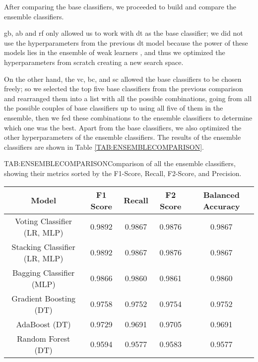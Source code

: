 After comparing the base classifiers, we proceeded to build and compare the ensemble classifiers.

\acl{gb}, \acl{ab} and \acl{rf} only allowed us to work with \acl{dt} as the base classifier; we did not use the hyperparameters from the previous \ac{dt} model because the power of these models lies in the ensemble of weak learners \cite{mannor_existence_2002}, and thus we optimized the hyperparameters from scratch creating a new search space.

On the other hand, the \acl{vc}, \acl{bc}, and \acl{sc} allowed the base classifiers to be chosen freely; so we selected the top five base classifiers from the previous comparison and rearranged them into a list with all the possible combinations, going from all the possible couples of base classifiers up to using all five of them in the ensemble, then we fed these combinations to the ensemble classifiers to determine which one was the best. Apart from the base classifiers, we also optimized the other hyperparameters of the ensemble classifiers. The results of the ensemble classifiers are shown in Table \ref{TAB:ENSEMBLECOMPARISON}.

\begin{table}[Ensemble Classifiers Comparison]{TAB:ENSEMBLECOMPARISON}{Comparison of all the ensemble classifiers, showing their metrics sorted by the F1-Score, Recall, F2-Score, and Precision.}
    \small
    \begin{tabular}{|c|c|c|c|c|}
        \hline
        \textbf{Model} & \textbf{F1 Score} & \textbf{Recall} & \textbf{F2 Score} & \textbf{Balanced Accuracy} \\
        \hline
        Voting Classifier (LR, MLP)        & 0.9892 & 0.9867 & 0.9876 & 0.9867 \\
        Stacking Classifier (LR, MLP)      & 0.9892 & 0.9867 & 0.9876 & 0.9867 \\
        Bagging Classifier (MLP)           & 0.9866 & 0.9860 & 0.9861 & 0.9860 \\
        Gradient Boosting (DT)             & 0.9758 & 0.9752 & 0.9754 & 0.9752 \\
        AdaBoost (DT)                      & 0.9729 & 0.9691 & 0.9705 & 0.9691 \\
        Random Forest (DT)                 & 0.9594 & 0.9577 & 0.9583 & 0.9577 \\
        \hline
    \end{tabular}
\end{table}

